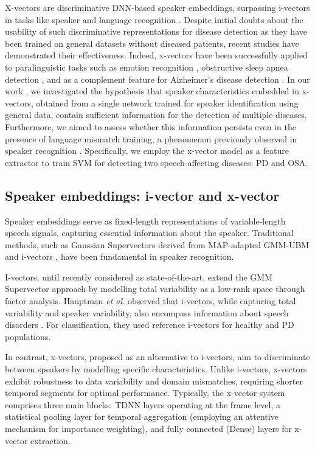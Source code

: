 X-vectors are discriminative \ac{DNN}-based speaker embeddings, surpassing i-vectors in tasks like speaker and language recognition \cite{snyder2018x}. Despite initial doubts about the usability of such discriminative representations for disease detection as they have been trained on general datasets without diseased patients, recent studies have demonstrated their effectiveness. Indeed, x-vectors have been successfully applied to paralinguistic tasks such as emotion recognition \cite{pappagari2020x}, obstructive sleep apnea detection \cite{perero2019modeling}, and as a complement feature for Alzheimer’s disease detection \cite{zargarbashi2019multi}. In our work \cite{botelho2020pathological}, we investigated the hypothesis that speaker characteristics embedded in x-vectors, obtained from a single network trained for speaker identification using general data, contain sufficient information for the detection of multiple diseases. Furthermore, we aimed to assess whether this information persists even in the presence of language mismatch training, a phenomenon previously observed in speaker recognition \cite{snyder2017deep}. Specifically, we employ the x-vector model as a feature extractor to train \ac{SVM} for detecting two speech-affecting diseases: \ac{PD} and  \ac{OSA}.

\subsection{Speaker embeddings: i-vector and x-vector}
Speaker embeddings serve as fixed-length representations of variable-length speech signals, capturing essential information about the speaker. Traditional methods, such as Gaussian Supervectors \cite{kenny2007joint} derived from \ac{MAP}-adapted \ac{GMM-UBM} \cite{reynolds2000speaker} and i-vectors \cite{dehak2010front}, have been fundamental in speaker recognition.

I-vectors, until recently considered as state-of-the-art, extend the \ac{GMM} Supervector approach by modelling total variability as a low-rank space through factor analysis. Hauptman \textit{et al.} observed that i-vectors, while capturing total variability and speaker variability, also encompass information about speech disorders \cite{hauptman2019identifying}. For classification, they used reference i-vectors for healthy and \ac{PD} populations.

In contrast, x-vectors, proposed as an alternative to i-vectors, aim to discriminate between speakers by modelling specific characteristics. Unlike i-vectors, x-vectors exhibit robustness to data variability and domain mismatches, requiring shorter temporal segments for optimal performance. Typically, the x-vector system comprises three main blocks: \ac{TDNN} layers operating at the frame level, a statistical pooling layer for temporal aggregation (employing an attentive mechanism for importance weighting), and fully connected (Dense) layers for x-vector extraction.

